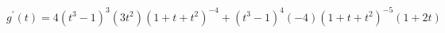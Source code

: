 $ \displaystyle g^{\prime}(t) = 4(t^3 - 1)^3(3t^2) (1 + t + t^2)^{-4} + (t^3 - 1)^4 (-4)(1 + t + t^2)^{-5}(1 + 2t) $